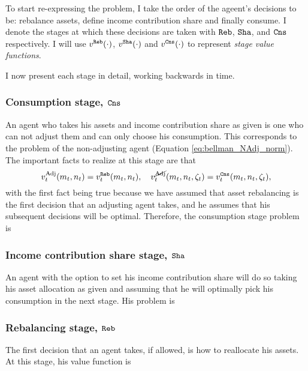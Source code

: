 \documentclass[./RiskyContrib.tex]{subfiles}
\begin{document}
To start re-expressing the problem, I take the order of the ageent's decisions to be:
rebalance assets, define income contribution share and finally consume. I denote the stages
at which these decisions are taken with $\mathtt{Reb}$, $\mathtt{Sha}$, and $\mathtt{Cns}$ respectively. I will use
$v^{\mathtt{Reb}}(\cdot)$, $v^{\mathtt{Sha}}(\cdot)$ and $v^{\mathtt{Cns}}(\cdot)$ to represent
\emph{stage value functions}.

I now present each stage in detail, working backwards in time.

\subsubsection{Consumption stage, $\mathtt{Cns}$}

An agent who takes his assets and income contribution share as given is one who
can not adjust them and can only choose his consumption. This corresponds to the
problem of the non-adjusting agent (Equation \ref{eq:bellman_NAdj_norm}). The
important facts to realize at this stage are that
\begin{equation*}
v_t^{\text{Adj}}(m_t, n_t) = v_t^{\mathtt{Reb}}(m_t, n_t), \quad v_t^{\cancel{\text{Adj}}}(m_t, n_t, \zeta_t) = v_t^{\mathtt{Cns}}(m_t, n_t, \zeta_t),
\end{equation*}
with the first fact being true because we have assumed that asset rebalancing
is the first decision that an adjusting agent takes, and he assumes that his
subsequent decisions will be optimal. Therefore, the consumption stage problem is
\begin{equation*}

\end{equation*}

\subsubsection{Income contribution share stage, $\mathtt{Sha}$}

An agent with the option to set his income contribution share will do so
taking his asset allocation as given and assuming that he will optimally
pick his consumption in the next stage. His problem is
\begin{equation*}

\end{equation*}

\subsubsection{Rebalancing stage, $\mathtt{Reb}$}

The first decision that an agent takes, if allowed, is how to reallocate his
assets. At this stage, his value function is
\begin{equation}\label{eq:bellman_reb}

\end{equation}
\end{document}
